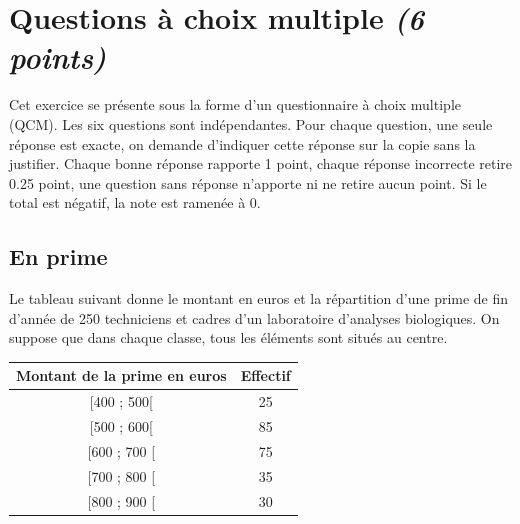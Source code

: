 
\section{Questions à choix multiple \textit{(6 points)}}\label{ex:qcm}

Cet exercice se présente sous la forme d'un questionnaire à choix multiple (QCM). Les six questions sont indépendantes. Pour chaque question, une seule réponse est exacte, on demande d'indiquer cette réponse sur la copie sans la justifier. Chaque bonne réponse rapporte 1 point, chaque réponse incorrecte retire \num{0.25} point, une question sans réponse n'apporte ni ne retire aucun point. Si le total est négatif, la note est ramenée à 0.
\vspace*{0.5cm}

\subsection{En prime}

Le tableau suivant donne le montant en euros et la répartition d'une prime de fin d'année de 250 techniciens et cadres d'un laboratoire d'analyses biologiques. On suppose que dans chaque classe, tous les éléments sont situés au centre.

{\small \begin{center}
	\begin{tabular}{|@{\ }c@{\ }|@{\ }c@{\ }|}
		\hline
		\textbf{Montant de la prime en euros} & \textbf{Effectif} \\ \hline
		[400 ; 500[                         & 25                \\ \hline
		[500 ; 600[                         & 85                \\ \hline
		[600 ; 700 [                        & 75                \\ \hline
		[700 ; 800 [                        & 35                \\ \hline
		[800 ; 900 [                        & 30                \\ \hline
	\end{tabular}
\end{center}}

